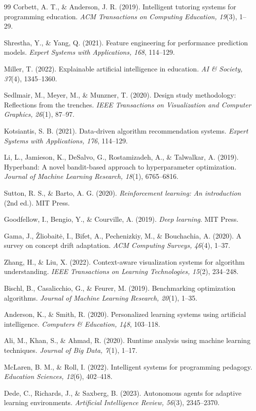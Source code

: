 \documentclass[12pt,a4paper,oneside,openany]{report}
\begin{document}
\begin{thebibliography}{99}
Corbett, A. T., \& Anderson, J. R. (2019).
Intelligent tutoring systems for programming education.
\textit{ACM Transactions on Computing Education, 19}(3), 1--29.

Shrestha, Y., \& Yang, Q. (2021).
Feature engineering for performance prediction models.
\textit{Expert Systems with Applications, 168}, 114--129.

Miller, T. (2022).
Explainable artificial intelligence in education.
\textit{AI \& Society, 37}(4), 1345--1360.

Sedlmair, M., Meyer, M., \& Munzner, T. (2020).
Design study methodology: Reflections from the trenches.
\textit{IEEE Transactions on Visualization and Computer Graphics, 26}(1), 87--97.

Kotsiantis, S. B. (2021).
Data-driven algorithm recommendation systems.
\textit{Expert Systems with Applications, 176}, 114--129.

Li, L., Jamieson, K., DeSalvo, G., Rostamizadeh, A., \& Talwalkar, A. (2019).
Hyperband: A novel bandit-based approach to hyperparameter optimization.
\textit{Journal of Machine Learning Research, 18}(1), 6765--6816.

Sutton, R. S., \& Barto, A. G. (2020).
\textit{Reinforcement learning: An introduction} (2nd ed.).
MIT Press.

Goodfellow, I., Bengio, Y., \& Courville, A. (2019).
\textit{Deep learning}.
MIT Press.

Gama, J., Žliobaitė, I., Bifet, A., Pechenizkiy, M., \& Bouchachia, A. (2020).
A survey on concept drift adaptation.
\textit{ACM Computing Surveys, 46}(4), 1--37.

Zhang, H., \& Liu, X. (2022).
Context-aware visualization systems for algorithm understanding.
\textit{IEEE Transactions on Learning Technologies, 15}(2), 234--248.

Bischl, B., Casalicchio, G., \& Feurer, M. (2019).
Benchmarking optimization algorithms.
\textit{Journal of Machine Learning Research, 20}(1), 1--35.

Anderson, K., \& Smith, R. (2020).
Personalized learning systems using artificial intelligence.
\textit{Computers \& Education, 148}, 103--118.

Ali, M., Khan, S., \& Ahmad, R. (2020).
Runtime analysis using machine learning techniques.
\textit{Journal of Big Data, 7}(1), 1--17.

McLaren, B. M., \& Roll, I. (2022).
Intelligent systems for programming pedagogy.
\textit{Education Sciences, 12}(6), 402--418.

Dede, C., Richards, J., \& Saxberg, B. (2023).
Autonomous agents for adaptive learning environments.
\textit{Artificial Intelligence Review, 56}(3), 2345--2370.

\end{thebibliography}
\end{document}
